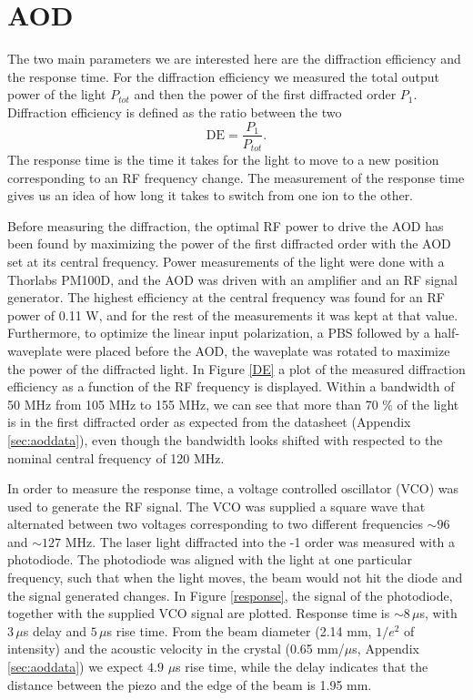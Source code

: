 \section{AOD}
\label{sec:resultaod}
The two main parameters we are interested here are the diffraction efficiency and the response time. For the diffraction efficiency we measured the total output power of the light $P_{tot}$ and then the power of the first diffracted order $P_{1}$. Diffraction efficiency is defined as the ratio between the two
\begin{equation}
\label{eq:de}
\text{DE} = \frac{P_1}{P_{tot}}.
\end{equation}
The response time is the time it takes for the light to move to a new position corresponding to an RF frequency change. The measurement of the response time gives us an idea of how long it takes to switch from one ion to the other.\par
Before measuring the diffraction, the optimal RF power to drive the AOD has been found by maximizing the power of the first diffracted order with the AOD set at its central frequency. Power measurements of the light were done with a Thorlabs PM100D, and the AOD was driven with an amplifier and an RF signal generator. The highest efficiency at the central frequency was found for an RF power of 0.11 W, and for the rest of the measurements it was kept at that value. Furthermore, to optimize the linear input polarization, a PBS followed by a half-waveplate were placed before the AOD, the waveplate was rotated to maximize the power of the diffracted light. In Figure \ref{DE} a plot of the measured diffraction efficiency as a function of the RF frequency is displayed. Within a bandwidth of 50 MHz from 105 MHz to 155 MHz, we can see that more than 70 \% of the light is in the first diffracted order as expected from the datasheet (Appendix \ref{sec:aoddata}), even though the bandwidth looks shifted with respected to the nominal central frequency of 120 MHz.\par
In order to measure the response time, a voltage controlled oscillator (VCO) was used to generate the RF signal. The VCO was supplied a square wave that alternated between two voltages corresponding to two different frequencies $\sim 96$ and $\sim 127$ MHz. The laser light diffracted into the -1 order was measured with a photodiode. The photodiode was aligned with the light at one particular frequency, such that when the light moves, the beam would not hit the diode and the signal generated changes. In Figure \ref{response}, the signal of the photodiode, together with the supplied VCO signal are plotted. Response time is $\sim 8\,\mu$s, with $3\,\mu$s delay and $5\,\mu$s rise time. From the beam diameter (2.14 mm, $1/e^2$ of intensity) and the acoustic velocity in the crystal (0.65 mm/$\mu$s, Appendix \ref{sec:aoddata}) we expect $4.9$ $\mu$s rise time, while the delay indicates that the distance between the piezo and the edge of the beam is 1.95 mm.


